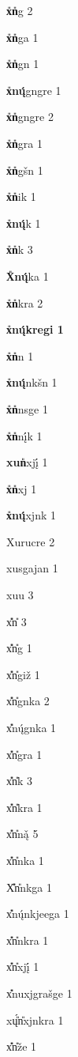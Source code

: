 \begin{table} 
\begin{multicols}{3}
\textbf{x{\U}n{\U}}{\II}g 2

\textbf{x{\U}n{\U}}{\II}ga 1

\textbf{x{\U}n{\U}}{\II}gn{\A} 1

\textbf{x{\U}n{\k{\'u}}}{\II}gn{\A}{\A}gre 1

\textbf{x{\U}n{\U}}{\II}gn{\A}{\A}gre 2

\textbf{x{\U}n{\U}}{\II}gra 1

\textbf{x{\U}n{\U}}{\II}g\v{s}{\A}n{\A} 1

\textbf{x{\U}n{\U}}ik 1

\textbf{x{\U}n{\k{\'u}}}{\II}k 1

\textbf{x{\U}n{\U}}{\II}k 3

\textbf{X{\U}n{\k{\'u}}}{\II}ka 1

\textbf{x{\U}n{\U}}{\II}kra 2

\textbf{x{\U}{n{\k{\'u}}}{\II}kregi 1}

\textbf{x{\U}n{\U}}n{\A} 1

\textbf{x{\U}n{\k{\'u}}}n{\A}{\A}k\v{s}{\A}n{\A} 1

\textbf{x{\U}n{\U}}n{\II}{\II}sge 1

\textbf{x{\U}n{\U}}n\k{\'{i}}k 1

\textbf{xun{\U}}xj\k{\'{i}} 1

\textbf{x{\U}n{\U}}xj{\II} 1

\textbf{x{\U}n{\k{\'u}}}xj{\II}n{\II}k 1

{Xurucre 2}

{xusgajan{\A} 1}

{xuu 3}

{x{\U}{\U}n{\U} 3}

{x{\U}{\U}n{\U}{\II}g 1}

{x{\U}{\U}n{\U}{\II}gi\v{z}{\A} 1}

{x{\U}{\U}n{\U}{\II}gn{\A}{\A}ka 2}

{x{\U}{\U}n{\k{\'u}}{\II}gn{\A}ka 1}

{x{\U}{\U}n{\U}{\II}gra 1}

{x{\U}{\U}n{\U}{\II}k 3}

{x{\U}{\U}n{\U}{\II}kra 1}

{x{\U}{\U}n{\U}n\k{\v{a}} 5}

{x{\U}{\U}n{\U}n{\A}ka 1}

{X{\U}{\U}n{\U}n{\II}kga 1}

{x{\U}{\U}n{\k{\'u}}n{\II}kjeega 1}

{x{\U}{\U}n{\U}n{\II}kra 1}

{x{\U}{\U}n{\U}xj\k{\'{i}} 1}

{x{\U}{\U}nuxj{\II}gra\v{s}ge 1}

{x{\k{\'u}}{\U}n{\U}xj{\II}n{\II}kra 1}

{x{\U}{\U}n{\U}\v{z}e 1} 
\end{multicols} 
\caption{Extract from the word list of the entire Hoc{\A}k corpus: \textit{x{\U}n{\U}}  `small, little'}
\label{bouda:tab:hocankwordlist}
\end{table}


